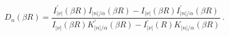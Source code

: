 \begin{equation}
D_{n}(\beta R)=\frac{I_{|\nu|}^{'}(\beta R)I_{|n|/\alpha}(\beta R)-I_{|\nu|}(\beta R)
I^{'}_{|n|/\alpha}(\beta R)}{I_{|\nu|}(\beta R)K^{'}_{|n|/\alpha}(\beta R)-
I_{|\nu|}^{'}(R)K_{|n|/\alpha}(\beta R)} \ .
\label{23}
\end{equation}


